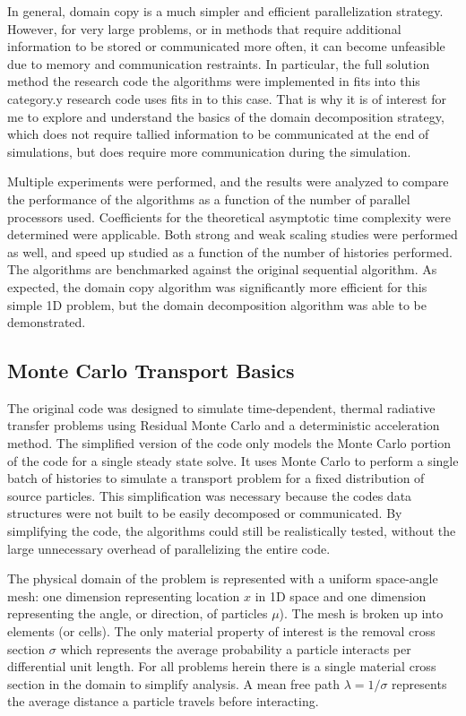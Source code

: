 \documentclass[12pt]{article}
\begin{document}
In general, domain copy is a much simpler and efficient parallelization strategy.  However, for
very large problems, or in methods that require additional information to be stored
or communicated more often, it can become unfeasible due to memory and communication
restraints.  In particular, the full solution method the research code the algorithms
were implemented in fits into this category.y research code uses fits in to
this case. That is why it is of interest for me to explore and understand the basics
of the domain decomposition strategy, which does not require tallied information to
be communicated at the end of simulations, but does require more communication during
the simulation.

Multiple experiments
were performed, and the results were analyzed to compare the performance of the
algorithms as a function of the number of parallel processors used.  Coefficients for the theoretical asymptotic time complexity were
determined were applicable. Both strong and weak scaling studies were performed as well, and speed up
studied as a function of the number of histories performed. The algorithms are benchmarked
against the original sequential algorithm. As expected, the domain copy algorithm was
significantly more efficient for this simple 1D problem, but the domain decomposition
algorithm was able to be demonstrated.

\subsection{Monte Carlo Transport Basics}

The original code was designed to simulate time-dependent, thermal radiative transfer
problems using Residual Monte Carlo and a deterministic acceleration method.  
The simplified version of the code only models the Monte Carlo portion of the code for
a single steady state solve.  It uses Monte Carlo to perform a single batch of
histories to simulate a transport problem for a fixed distribution of source particles.  This simplification was necessary because the
codes data structures were not built to be easily decomposed or communicated.  By
simplifying the code, the algorithms could still be realistically tested, without the
large unnecessary overhead of parallelizing the entire code.

The physical domain of the problem is represented with a uniform space-angle mesh: one
dimension representing location $x$ in 1D space and one dimension representing the
angle, or direction, of particles $\mu$).  The mesh is broken up into elements (or cells).
The only material property of interest is the removal cross section $\sigma$ which
represents the average probability a particle interacts per differential unit length. For
all problems herein there is a single material cross section in the domain to
simplify analysis. A mean free path $\lambda = 1/\sigma$ represents the average
distance a particle travels before interacting.
\end{document}
